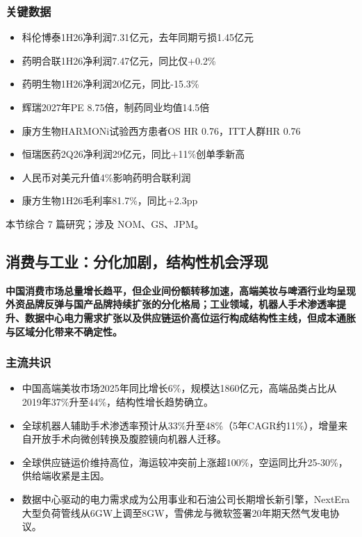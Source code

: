 \documentclass[11pt]{ctexart}
\begin{document}
\subsubsection*{关键数据}
\begin{itemize}
  \item 科伦博泰1H26净利润7.31亿元，去年同期亏损1.45亿元
  \item 药明合联1H26净利润7.47亿元，同比仅+0.2\%
  \item 药明生物1H26净利润20亿元，同比-15.3\%
  \item 辉瑞2027年PE 8.75倍，制药同业均值14.5倍
  \item 康方生物HARMONi试验西方患者OS HR 0.76，ITT人群HR 0.76
  \item 恒瑞医药2Q26净利润29亿元，同比+11\%创单季新高
  \item 人民币对美元升值4\%影响药明合联利润
  \item 康方生物1H26毛利率81.7\%，同比+2.3pp
\end{itemize}
{\small\color{refgray}本节综合 7 篇研究；涉及 NOM、GS、JPM。}
\newpage
\subsection{消费与工业：分化加剧，结构性机会浮现}
\textbf{中国消费市场总量增长趋平，但企业间份额转移加速，高端美妆与啤酒行业均呈现外资品牌反弹与国产品牌持续扩张的分化格局；工业领域，机器人手术渗透率提升、数据中心电力需求扩张以及供应链运价高位运行构成结构性主线，但成本通胀与区域分化带来不确定性。}
\subsubsection*{主流共识}
\begin{itemize}
  \item 中国高端美妆市场2025年同比增长6\%，规模达1860亿元，高端品类占比从2019年37\%升至44\%，结构性增长趋势确立。
  \item 全球机器人辅助手术渗透率预计从33\%升至48\%（5年CAGR约11\%），增量来自开放手术向微创转换及腹腔镜向机器人迁移。
  \item 全球供应链运价维持高位，海运较冲突前上涨超100\%，空运同比升25-30\%，供给端收紧是主因。
  \item 数据中心驱动的电力需求成为公用事业和石油公司长期增长新引擎，NextEra大型负荷管线从6GW上调至8GW，雪佛龙与微软签署20年期天然气发电协议。
\end{itemize}
\end{document}
